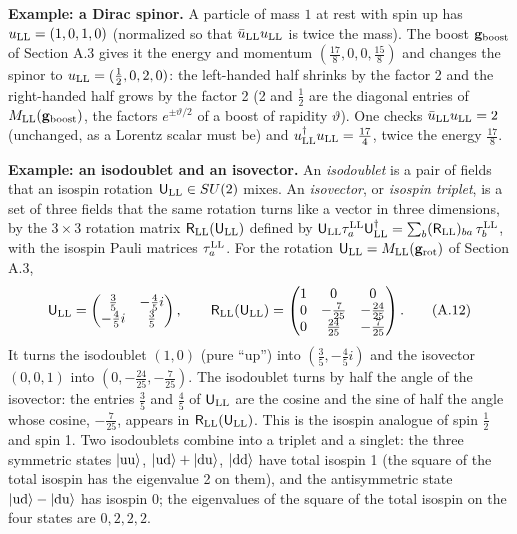 \documentclass[
  10pt,
]{article}
\begin{document}
\textbf{Example: a Dirac spinor.} A particle of mass \(1\) at rest with
spin up has \(u_{\rm LL}=(1,0,1,0)\) (normalized so that
\(\bar u_{\rm LL}u_{\rm LL}\) is twice the mass). The boost
\(\mathbf g_{\rm boost}\) of Section A.3 gives it the energy and
momentum \((\tfrac{17}{8},0,0,\tfrac{15}{8})\) and changes the spinor to
\(u_{\rm LL}=(\tfrac{1}{2},0,2,0)\): the left-handed half shrinks by the
factor 2 and the right-handed half grows by the factor 2 (2 and
\(\tfrac12\) are the diagonal entries of
\(M_{\rm LL}(\mathbf g_{\rm boost})\), the factors
\(e^{\pm\vartheta/2}\) of a boost of rapidity \(\vartheta\)). One checks
\(\bar u_{\rm LL}u_{\rm LL}=2\) (unchanged, as a Lorentz scalar must be)
and \(u_{\rm LL}^\dagger u_{\rm LL}=\tfrac{17}{4}\), twice the energy
\(\tfrac{17}8\).

\textbf{Example: an isodoublet and an isovector.} An \emph{isodoublet}
is a pair of fields that an isospin rotation
\(\mathsf U_{\rm LL}\in SU(2)\) mixes. An \emph{isovector}, or
\emph{isospin triplet}, is a set of three fields that the same rotation
turns like a vector in three dimensions, by the \(3\times3\) rotation
matrix \(\mathsf R_{\rm LL}(\mathsf U_{\rm LL})\) defined by
\(\mathsf U_{\rm LL}\tau^{\rm LL}_a\mathsf U_{\rm LL}^\dagger=\sum_b(\mathsf R_{\rm LL})_{ba}\,\tau^{\rm LL}_b\),
with the isospin Pauli matrices \(\tau^{\rm LL}_a\). For the rotation
\(\mathsf U_{\rm LL}=M_{\rm LL}(\mathbf g_{\rm rot})\) of Section A.3,
\[\mathsf U_{\rm LL}=\begin{pmatrix}\tfrac{3}{5}&-\tfrac{4}{5}i\\-\tfrac{4}{5}i&\tfrac{3}{5}\end{pmatrix},\qquad\mathsf R_{\rm LL}(\mathsf U_{\rm LL})=\begin{pmatrix}1&0&0\\0&-\tfrac{7}{25}&-\tfrac{24}{25}\\0&\tfrac{24}{25}&-\tfrac{7}{25}\end{pmatrix}.\tag{A.12}\]
It turns the isodoublet \((1,0)\) (pure ``up'') into
\((\tfrac{3}{5},-\tfrac{4}{5}i)\) and the isovector \((0,0,1)\) into
\((0,-\tfrac{24}{25},-\tfrac{7}{25})\). The isodoublet turns by half the
angle of the isovector: the entries \(\tfrac35\) and \(\tfrac45\) of
\(\mathsf U_{\rm LL}\) are the cosine and the sine of half the angle
whose cosine, \(-\tfrac7{25}\), appears in
\(\mathsf R_{\rm LL}(\mathsf U_{\rm LL})\). This is the isospin analogue
of spin \(\tfrac12\) and spin 1. Two isodoublets combine into a triplet
and a singlet: the three symmetric states \(|{\rm uu}\rangle\),
\(|{\rm ud}\rangle+|{\rm du}\rangle\), \(|{\rm dd}\rangle\) have total
isospin 1 (the square of the total isospin has the eigenvalue 2 on
them), and the antisymmetric state \(|{\rm ud}\rangle-|{\rm du}\rangle\)
has isospin 0; the eigenvalues of the square of the total isospin on the
four states are \(0, 2, 2, 2\).
\end{document}

